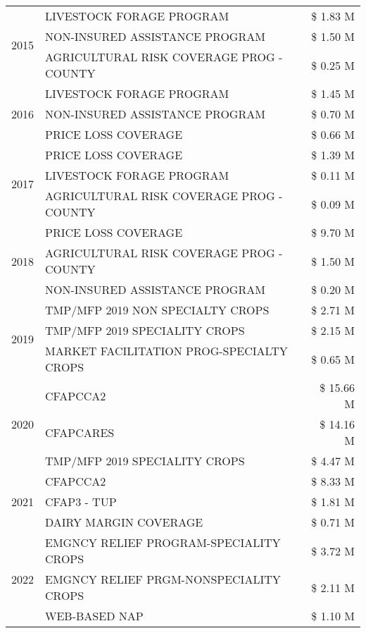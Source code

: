 \begin{tabular}{llr}
\cline{1-3}
\multirow[t]{3}{*}{2015} & LIVESTOCK FORAGE PROGRAM & \$ 1.83 M \\
 & NON-INSURED ASSISTANCE PROGRAM & \$ 1.50 M \\
 & AGRICULTURAL RISK COVERAGE PROG - COUNTY & \$ 0.25 M \\
\cline{1-3}
\multirow[t]{3}{*}{2016} & LIVESTOCK FORAGE PROGRAM & \$ 1.45 M \\
 & NON-INSURED ASSISTANCE PROGRAM & \$ 0.70 M \\
 & PRICE LOSS COVERAGE & \$ 0.66 M \\
\cline{1-3}
\multirow[t]{3}{*}{2017} & PRICE LOSS COVERAGE & \$ 1.39 M \\
 & LIVESTOCK FORAGE PROGRAM & \$ 0.11 M \\
 & AGRICULTURAL RISK COVERAGE PROG - COUNTY & \$ 0.09 M \\
\cline{1-3}
\multirow[t]{3}{*}{2018} & PRICE LOSS COVERAGE & \$ 9.70 M \\
 & AGRICULTURAL RISK COVERAGE PROG - COUNTY & \$ 1.50 M \\
 & NON-INSURED ASSISTANCE PROGRAM & \$ 0.20 M \\
\cline{1-3}
\multirow[t]{3}{*}{2019} & TMP/MFP 2019 NON SPECIALTY CROPS & \$ 2.71 M \\
 & TMP/MFP 2019 SPECIALITY CROPS & \$ 2.15 M \\
 & MARKET FACILITATION PROG-SPECIALTY CROPS & \$ 0.65 M \\
\cline{1-3}
\multirow[t]{3}{*}{2020} & CFAPCCA2 & \$ 15.66 M \\
 & CFAPCARES & \$ 14.16 M \\
 & TMP/MFP 2019 SPECIALITY CROPS & \$ 4.47 M \\
\cline{1-3}
\multirow[t]{3}{*}{2021} & CFAPCCA2 & \$ 8.33 M \\
 & CFAP3 - TUP & \$ 1.81 M \\
 & DAIRY MARGIN COVERAGE & \$ 0.71 M \\
\cline{1-3}
\multirow[t]{3}{*}{2022} & EMGNCY RELIEF PROGRAM-SPECIALITY CROPS & \$ 3.72 M \\
 & EMGNCY RELIEF PRGM-NONSPECIALITY CROPS & \$ 2.11 M \\
 & WEB-BASED NAP & \$ 1.10 M \\
\cline{1-3}
\bottomrule
\end{tabular}
